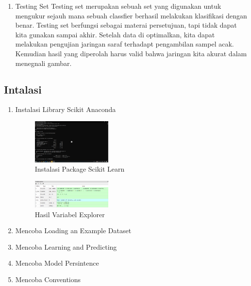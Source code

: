 \begin{enumerate}
\item Testing Set
Testing set merupakan sebuah set yang digunakan untuk mengukur sejauh mana sebuah classfier berhasil melakukan klasifikasi dengan benar. Testing set berfungsi sebagai materai persetujuan, tapi tidak dapat kita gunakan sampai akhir. Setelah data di optimalkan, kita dapat melakukan pengujian jaringan saraf terhadapt pengambilan sampel acak. Kemudian hasil yang diperolah harus valid bahwa jaringan kita akurat dalam menegnali gambar.\\

\end{enumerate}

\subsection{Intalasi}
\begin{enumerate}
\item Instalasi  Library Scikit Anaconda
	\hfill\break
	\begin{figure}[H]
		\includegraphics[width=4cm]{figures/1174062/1.PNG}
		\centering
		\caption{Instalasi Package Scikit Learn}
	\end{figure}
	\begin{figure}[H]
		\includegraphics[width=4cm]{figures/1174062/2.PNG}
		\centering
		\caption{Hasil Variabel Explorer}
	\end{figure}
\item Mencoba Loading an Example Dataset
\hfill\break
	
\item Mencoba Learning and Predicting
\hfill\break
	
\item Mencoba Model Persintence
\hfill\break
	
\item Mencoba Conventions
\hfill\break
	


\end{enumerate}
